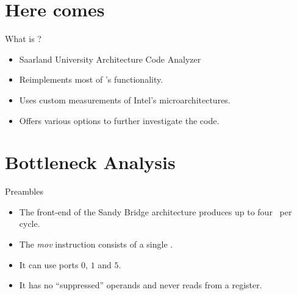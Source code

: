 \documentclass[10pt, tikz,border=2mm, xcolor=dvipsnames]{beamer}
\begin{document}
\section{Here comes \suaca}

\begin{frame}{What is \suaca?}

\begin{itemize}[<+- | alert@+>]
    \item Saarland University Architecture Code Analyzer
    \item Reimplements most of \iaca's functionality.
    \item Uses custom measurements of Intel's microarchitectures.
    \item Offers various options to further investigate the code.
\end{itemize}
\end{frame}






\section{Bottleneck Analysis}

\begin{frame}{Preambles}

\begin{itemize}[<+- | alert@+>]
    \item The front-end of the Sandy Bridge architecture produces up to four \microops\ per cycle.
    \item The \emph{mov} instruction consists of a single \microop.
    \item It can use ports $0$, $1$ and $5$.
    \item It has no ``suppressed'' operands and never reads from a register.
\end{itemize}
\end{frame}
\end{document}
